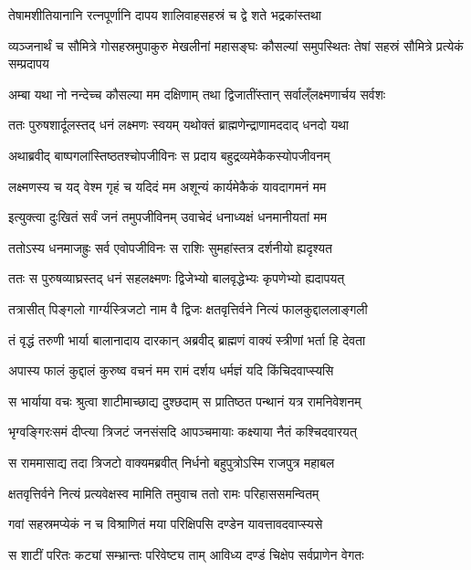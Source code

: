 \twolineshloka
{तेषामशीतियानानि रत्नपूर्णानि दापय}
{शालिवाहसहस्रं च द्वे शते भद्रकांस्तथा} %

\threelineshloka
{व्यञ्जनार्थं च सौमित्रे गोसहस्रमुपाकुरु}
{मेखलीनां महासङ्घः कौसल्यां समुपस्थितः}
{तेषां सहस्रं सौमित्रे प्रत्येकं सम्प्रदापय} %

\twolineshloka
{अम्बा यथा नो नन्देच्च कौसल्या मम दक्षिणाम्}
{तथा द्विजातींस्तान् सर्वाल्ँलक्ष्मणार्चय सर्वशः} %

\twolineshloka
{ततः पुरुषशार्दूलस्तद् धनं लक्ष्मणः स्वयम्}
{यथोक्तं ब्राह्मणेन्द्राणामददाद् धनदो यथा} %

\twolineshloka
{अथाब्रवीद् बाष्पगलांस्तिष्ठतश्चोपजीविनः}
{स प्रदाय बहुद्रव्यमेकैकस्योपजीवनम्} %

\twolineshloka
{लक्ष्मणस्य च यद् वेश्म गृहं च यदिदं मम}
{अशून्यं कार्यमेकैकं यावदागमनं मम} %

\twolineshloka
{इत्युक्त्वा दुःखितं सर्वं जनं तमुपजीविनम्}
{उवाचेदं धनाध्यक्षं धनमानीयतां मम} %

\twolineshloka
{ततोऽस्य धनमाजह्रुः सर्व एवोपजीविनः}
{स राशिः सुमहांस्तत्र दर्शनीयो ह्यदृश्यत} %

\twolineshloka
{ततः स पुरुषव्याघ्रस्तद् धनं सहलक्ष्मणः}
{द्विजेभ्यो बालवृद्धेभ्यः कृपणेभ्यो ह्यदापयत्} %

\twolineshloka
{तत्रासीत् पिङ्गलो गार्ग्यस्त्रिजटो नाम वै द्विजः}
{क्षतवृत्तिर्वने नित्यं फालकुद्दाललाङ्गली} %

\twolineshloka
{तं वृद्धं तरुणी भार्या बालानादाय दारकान्}
{अब्रवीद् ब्राह्मणं वाक्यं स्त्रीणां भर्ता हि देवता} %

\twolineshloka
{अपास्य फालं कुद्दालं कुरुष्व वचनं मम}
{रामं दर्शय धर्मज्ञं यदि किंचिदवाप्स्यसि} %

\twolineshloka
{स भार्याया वचः श्रुत्वा शाटीमाच्छाद्य दुश्छदाम्}
{स प्रातिष्ठत पन्थानं यत्र रामनिवेशनम्} %

\twolineshloka
{भृग्वङ्गिरःसमं दीप्त्या त्रिजटं जनसंसदि}
{आपञ्चमायाः कक्ष्याया नैतं कश्चिदवारयत्} %

\twolineshloka
{स राममासाद्य तदा त्रिजटो वाक्यमब्रवीत्}
{निर्धनो बहुपुत्रोऽस्मि राजपुत्र महाबल} %

\twolineshloka
{क्षतवृत्तिर्वने नित्यं प्रत्यवेक्षस्व मामिति}
{तमुवाच ततो रामः परिहाससमन्वितम्} %

\twolineshloka
{गवां सहस्रमप्येकं न च विश्राणितं मया}
{परिक्षिपसि दण्डेन यावत्तावदवाप्स्यसे} %

\twolineshloka
{स शाटीं परितः कट्यां सम्भ्रान्तः परिवेष्ट्य ताम्}
{आविध्य दण्डं चिक्षेप सर्वप्राणेन वेगतः} %

